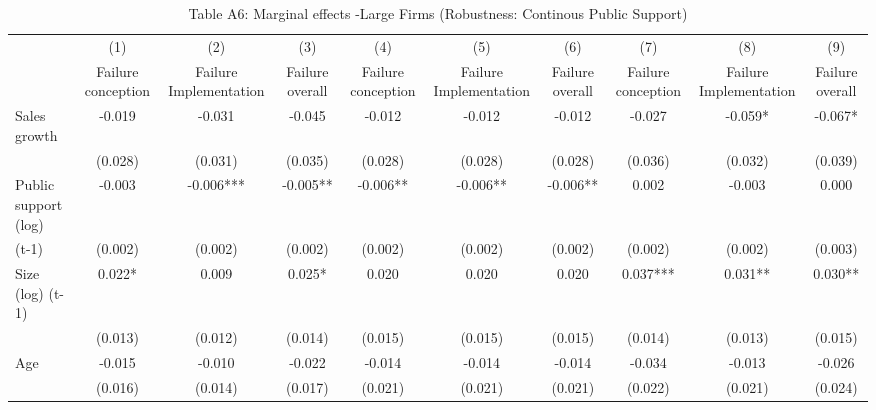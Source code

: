 \begin{table}[htbp]\centering
\def\sym#1{\ifmmode^{#1}\else\(^{#1}\)\fi}
\caption{{Table A6: Marginal effects -Large Firms (Robustness: Continous Public Support)}}
\begin{tabular}{l*{9}{c}}
\hline\hline
                    &\multicolumn{1}{c}{(1)}&\multicolumn{1}{c}{(2)}&\multicolumn{1}{c}{(3)}&\multicolumn{1}{c}{(4)}&\multicolumn{1}{c}{(5)}&\multicolumn{1}{c}{(6)}&\multicolumn{1}{c}{(7)}&\multicolumn{1}{c}{(8)}&\multicolumn{1}{c}{(9)}\\
                    &\multicolumn{1}{c}{Failure conception}&\multicolumn{1}{c}{Failure Implementation}&\multicolumn{1}{c}{Failure overall}&\multicolumn{1}{c}{Failure conception}&\multicolumn{1}{c}{Failure Implementation}&\multicolumn{1}{c}{Failure overall}&\multicolumn{1}{c}{Failure conception}&\multicolumn{1}{c}{Failure Implementation}&\multicolumn{1}{c}{Failure overall}\\
\hline
Sales growth        &      -0.019   &      -0.031   &      -0.045   &      -0.012   &      -0.012   &      -0.012   &      -0.027   &      -0.059*  &      -0.067*  \\
                    &     (0.028)   &     (0.031)   &     (0.035)   &     (0.028)   &     (0.028)   &     (0.028)   &     (0.036)   &     (0.032)   &     (0.039)   \\
Public support (log)&      -0.003   &      -0.006***&      -0.005** &      -0.006** &      -0.006** &      -0.006** &       0.002   &      -0.003   &       0.000   \\
(t-1)               &     (0.002)   &     (0.002)   &     (0.002)   &     (0.002)   &     (0.002)   &     (0.002)   &     (0.002)   &     (0.002)   &     (0.003)   \\
Size (log) (t-1)    &       0.022*  &       0.009   &       0.025*  &       0.020   &       0.020   &       0.020   &       0.037***&       0.031** &       0.030** \\
                    &     (0.013)   &     (0.012)   &     (0.014)   &     (0.015)   &     (0.015)   &     (0.015)   &     (0.014)   &     (0.013)   &     (0.015)   \\
Age                 &      -0.015   &      -0.010   &      -0.022   &      -0.014   &      -0.014   &      -0.014   &      -0.034   &      -0.013   &      -0.026   \\
                    &     (0.016)   &     (0.014)   &     (0.017)   &     (0.021)   &     (0.021)   &     (0.021)   &     (0.022)   &     (0.021)   &     (0.024)   \\

\end{tabular}
\end{table}
